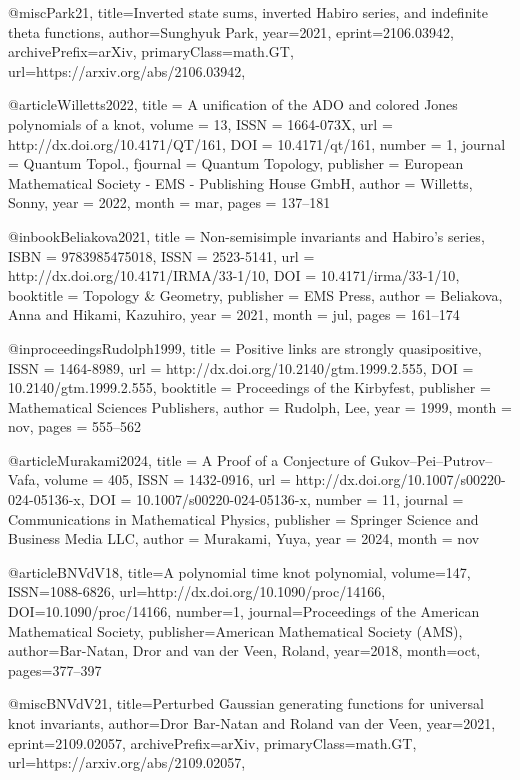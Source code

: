 @misc{Park21,
  title={Inverted state sums, inverted {Habiro} series, and indefinite theta functions}, 
  author={Sunghyuk Park},
  year={2021},
  eprint={2106.03942},
  archivePrefix={arXiv},
  primaryClass={math.GT},
  url={https://arxiv.org/abs/2106.03942}, 
}

@article{Willetts2022,
  title = {A unification of the {ADO} and colored {Jones} polynomials of a knot},
  volume = {13},
  ISSN = {1664-073X},
  url = {http://dx.doi.org/10.4171/QT/161},
  DOI = {10.4171/qt/161},
  number = {1},
  journal = {Quantum Topol.},
  fjournal = {Quantum Topology},
  publisher = {European Mathematical Society - EMS - Publishing House GmbH},
  author = {Willetts,  Sonny},
  year = {2022},
  month = mar,
  pages = {137--181}
}

@inbook{Beliakova2021,
  title = {Non-semisimple invariants and Habiro’s series},
  ISBN = {9783985475018},
  ISSN = {2523-5141},
  url = {http://dx.doi.org/10.4171/IRMA/33-1/10},
  DOI = {10.4171/irma/33-1/10},
  booktitle = {Topology \& Geometry},
  publisher = {EMS Press},
  author = {Beliakova,  Anna and Hikami,  Kazuhiro},
  year = {2021},
  month = jul,
  pages = {161--174}
}

@inproceedings{Rudolph1999,
  title = {Positive links are strongly quasipositive},
  ISSN = {1464-8989},
  url = {http://dx.doi.org/10.2140/gtm.1999.2.555},
  DOI = {10.2140/gtm.1999.2.555},
  booktitle = {Proceedings of the Kirbyfest},
  publisher = {Mathematical Sciences Publishers},
  author = {Rudolph,  Lee},
  year = {1999},
  month = nov,
  pages = {555--562}
}

@article{Murakami2024,
  title = {A Proof of a Conjecture of Gukov--Pei--Putrov--Vafa},
  volume = {405},
  ISSN = {1432-0916},
  url = {http://dx.doi.org/10.1007/s00220-024-05136-x},
  DOI = {10.1007/s00220-024-05136-x},
  number = {11},
  journal = {Communications in Mathematical Physics},
  publisher = {Springer Science and Business Media LLC},
  author = {Murakami,  Yuya},
  year = {2024},
  month = nov 
}

@article{BNVdV18,
   title={A polynomial time knot polynomial},
   volume={147},
   ISSN={1088-6826},
   url={http://dx.doi.org/10.1090/proc/14166},
   DOI={10.1090/proc/14166},
   number={1},
   journal={Proceedings of the American Mathematical Society},
   publisher={American Mathematical Society (AMS)},
   author={Bar-Natan, Dror and van der Veen, Roland},
   year={2018},
   month=oct, pages={377--397} 
}

@misc{BNVdV21,
  title={Perturbed {Gaussian} generating functions for universal knot invariants}, 
  author={Dror Bar-Natan and Roland van der Veen},
  year={2021},
  eprint={2109.02057},
  archivePrefix={arXiv},
  primaryClass={math.GT},
  url={https://arxiv.org/abs/2109.02057}, 
}

